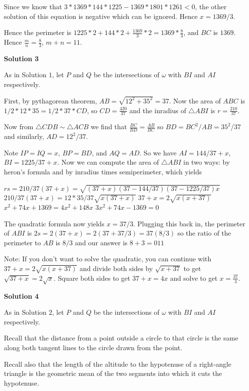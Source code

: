 \begin{enumerate}
 Since we know that $3*1369*144*1225 - 1369*1801*1261 < 0$, the other solution of this equation is negative which can be ignored. Hence $x = 1369/3$. 

 Hence the perimeter is $1225*2 + 144*2 + \frac {1369}{3} *2 = 1369* \frac {8}{3}$, and $BC$ is $1369$. Hence $\frac {m}{n} = \frac {8}{3}$, $m + n = 11$.

 



\textbf{Solution 3}

As in Solution $1$, let $P$ and $Q$ be the intersections of $\omega$ with $BI$ and $AI$ respectively.

 First, by pythagorean theorem, $AB = \sqrt{12^2+35^2} = 37$.  Now the area of $ABC$ is $1/2*12*35 = 1/2*37*CD$, so $CD=\frac{420}{37}$ and the inradius of $\triangle ABI$ is $r=\frac{210}{37}$.

 Now from $\triangle CDB \sim \triangle ACB$ we find that $\frac{BC}{BD} = \frac{AB}{BC}$ so $BD = BC^2/AB = 35^2/37$ and similarly, $AD = 12^2/37$.

 Note $IP=IQ=x$, $BP=BD$, and $AQ=AD$. So we have $AI = 144/37+x$, $BI = 1225/37+x$.  Now we can compute the area of $\triangle ABI$ in two ways: by heron's formula and by inradius times semiperimeter, which yields

 $rs=210/37(37+x) = \sqrt{(37+x)(37-144/37)(37-1225/37)x}$
$210/37(37+x) = 12*35/37 \sqrt{x(37+x)}$
$37+x = 2 \sqrt{x(x+37)}$
$x^2+74x+1369 = 4x^2 + 148x$
$3x^2 + 74x - 1369 = 0$

 The quadratic formula now yields $x=37/3$.  Plugging this back in, the perimeter of $ABI$ is $2s=2(37+x)=2(37+37/3) = 37(8/3)$ so the ratio of the perimeter to $AB$ is $8/3$ and our answer is $8+3=\boxed{011}$

 Note: If you don't want to solve the quadratic, you can continue with $37+x = 2 \sqrt{x(x+37)}$ and divide both sides by $\sqrt{x+37}$ to get $\sqrt{37+x} = 2 \sqrt{x}$. Square both sides to get $37+x = 4x$ and solve to get $x=\frac{37}{3}$.

 



\textbf{Solution 4}

As in Solution $2$, let $P$ and $Q$ be the intersections of $\omega$ with $BI$ and $AI$ respectively.

 Recall that the distance from a point outside a circle to that circle is the same along both tangent lines to the circle drawn from the point.

 Recall also that the length of the altitude to the hypotenuse of a right-angle triangle is the geometric mean of the two segments into which it cuts the hypotenuse.


\end{enumerate}
